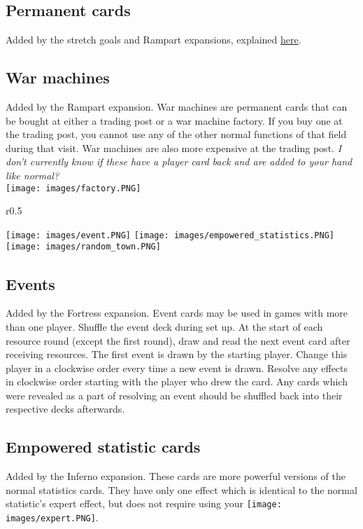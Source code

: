 \documentclass[12pt]{article}
\begin{document}
\subsection*{Permanent cards}
Added by the stretch goals and Rampart expansions, explained \hyperlink{Playerdecks}{here}.
\subsection*{War machines}
Added by the Rampart expansion. War machines are permanent cards that can be bought at either a trading post or a war machine factory. If you buy one at the trading post, you cannot use any of the other normal functions of that field during that visit. War machines are also more expensive at the trading post. \textit{I don't currently know if these have a player card back and are added to your hand like normal?}\\[6pt]
\texttt{[image: images/factory.PNG]}

\clearpage
\begin{wrapfigure}{r}{0.5\textwidth}
    \begin{center}
    \texttt{[image: images/event.PNG]}
    \texttt{[image: images/empowered\_statistics.PNG]}
    \texttt{[image: images/random\_town.PNG]}
    \end{center}
\end{wrapfigure}
\subsection*{Events}
Added by the Fortress expansion. Event cards may be used in games with more than one player. Shuffle the event deck during set up. At the start of each resource round (except the first round), draw and read the next event card after receiving resources. The first event is drawn by the starting player. Change this player in a clockwise order every time a new event is drawn. Resolve any effects in clockwise order starting with the player who drew the card. Any cards which were revealed as a part of resolving an event should be shuffled back into their respective decks afterwards.
\subsection*{Empowered statistic cards}
Added by the Inferno expansion. These cards are more powerful versions of the normal statistics cards. They have only one effect which is identical to the normal statistic's expert effect, but does not require using your \texttt{[image: images/expert.PNG]}.
\end{document}
